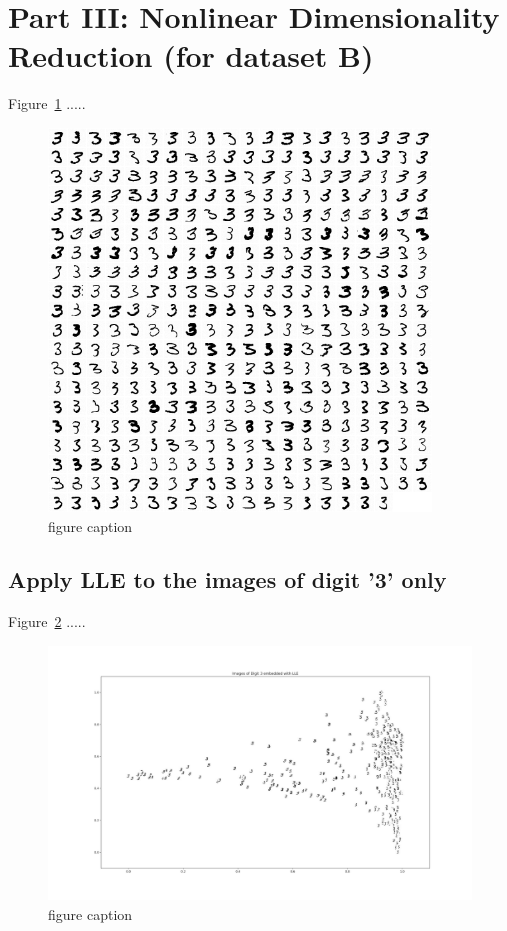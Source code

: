 \section{Part III: Nonlinear Dimensionality Reduction (for dataset B)}

Figure~\ref{fig:fig8} .....
\begin{figure}[htb]
 \centering
\includegraphics[width=4in]{assignment1/3-0-alldigit3.png}
\caption{\label{fig:fig8}figure caption}
\end{figure}


\clearpage{}
\subsection{Apply LLE to the images of digit '3' only}


Figure~\ref{fig:fig9} .....
\begin{figure}[htb]
 \centering
\includegraphics[width=\textwidth]{assignment1/3-1-LLEembedding.png}
\caption{\label{fig:fig9}figure caption}
\end{figure}




